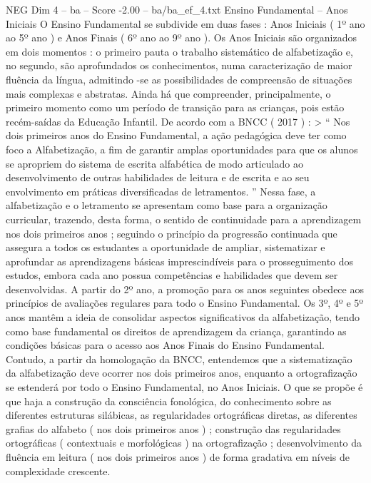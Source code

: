 \begin{textsample}{NEG Dim 4 – ba – Score -2.00 – ba/ba\_ef\_4.txt}  \label{ex:f4_neg_262}
Ensino Fundamental – Anos Iniciais O Ensino Fundamental se subdivide em duas fases : Anos Iniciais ( 1º ano ao 5º ano ) e Anos Finais ( 6º ano ao 9º ano ).
Os Anos Iniciais são organizados em dois momentos : o primeiro pauta o trabalho sistemático de alfabetização e, no segundo, são aprofundados os conhecimentos, numa caracterização de maior fluência da língua, admitindo -se as possibilidades de compreensão de situações mais complexas e abstratas.
Ainda há que compreender, principalmente, o primeiro momento como um período de transição para as crianças, pois estão recém-saídas da Educação Infantil.
De acordo com a BNCC ( 2017 ) : > “ Nos dois primeiros anos do Ensino Fundamental, a ação pedagógica deve ter como foco a Alfabetização, a fim de garantir amplas oportunidades para que os alunos se apropriem do sistema de escrita alfabética de modo articulado ao desenvolvimento de outras habilidades de leitura e de escrita e ao seu envolvimento em práticas diversificadas de letramentos. ” Nessa fase, a alfabetização e o letramento se apresentam como base para a organização curricular, trazendo, desta forma, o sentido de continuidade para a aprendizagem nos dois primeiros anos ; seguindo o princípio da progressão continuada que assegura a todos os estudantes a oportunidade de ampliar, sistematizar e aprofundar as aprendizagens básicas imprescindíveis para o prosseguimento dos estudos, embora cada ano possua competências e habilidades que devem ser desenvolvidas.
A partir do 2º ano, a promoção para os anos seguintes obedece aos princípios de avaliações regulares para todo o Ensino Fundamental.
Os 3º, 4º e 5º anos mantêm a ideia de consolidar aspectos significativos da alfabetização, tendo como base fundamental os direitos de aprendizagem da criança, garantindo as condições básicas para o acesso aos Anos Finais do Ensino Fundamental.
Contudo, a partir da homologação da BNCC, entendemos que a sistematização da alfabetização deve ocorrer nos dois primeiros anos, enquanto a ortografização se estenderá por todo o Ensino Fundamental, no Anos Iniciais.
O que se propõe é que haja a construção da consciência fonológica, do conhecimento sobre as diferentes estruturas silábicas, as regularidades ortográficas diretas, as diferentes grafias do alfabeto ( nos dois primeiros anos ) ; construção das regularidades ortográficas ( contextuais e morfológicas ) na ortografização ; desenvolvimento da fluência em leitura ( nos dois primeiros anos ) de forma gradativa em níveis de complexidade crescente.

\end{textsample}
